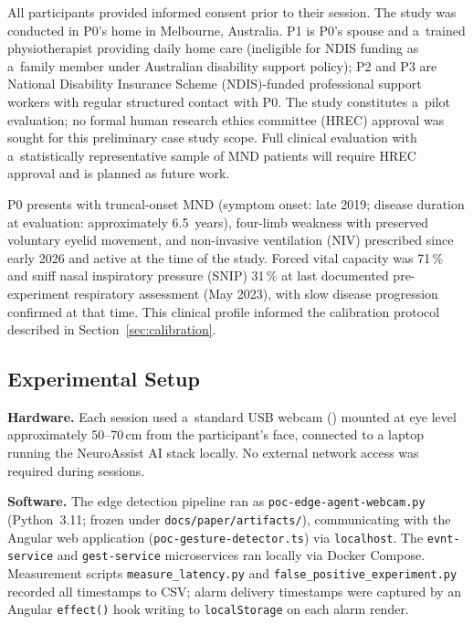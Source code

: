 All participants provided informed consent prior to their session. The study was
conducted in P0's home in Melbourne, Australia. P1 is P0's spouse and a~trained
physiotherapist providing daily home care (ineligible for NDIS funding as a~family
member under Australian disability support policy); P2 and P3 are National Disability
Insurance Scheme (NDIS)-funded professional support workers with regular structured
contact with P0. The study constitutes a~pilot
evaluation; no formal human research ethics committee (HREC) approval was sought for
this preliminary case study scope. Full clinical evaluation with a~statistically representative sample of MND
patients will require HREC approval and is planned as future work.

P0 presents with truncal-onset MND (symptom onset: late 2019; disease duration at evaluation: approximately 6.5~years), four-limb weakness with preserved voluntary eyelid movement, and non-invasive ventilation (NIV) prescribed since early 2026 and active at the time of the study. Forced vital capacity was 71\,\% and sniff nasal inspiratory pressure (SNIP) 31\,\% at last documented pre-experiment respiratory assessment (May 2023), with slow disease progression confirmed at that time.  This clinical profile informed the calibration protocol described in Section~\ref{sec:calibration}.

\subsection{Experimental Setup}
\label{sec:setup}

\textbf{Hardware.} Each session used a~standard USB webcam
() mounted
at eye level approximately 50--70\,cm from the participant's face, connected to a
laptop running the NeuroAssist AI stack locally. No external network access was
required during sessions.

\textbf{Software.} The edge detection pipeline ran as
\texttt{poc-edge-agent-webcam.py} (Python~3.11; frozen under \texttt{docs/paper/artifacts/}), communicating with the Angular
web application (\texttt{poc-gesture-detector.ts}) via \texttt{localhost}. The
\texttt{evnt-service} and \texttt{gest-service} microservices ran locally via Docker
Compose. Measurement scripts \texttt{measure\_latency.py} and
\texttt{false\_positive\_experiment.py} recorded all timestamps to CSV; alarm
delivery timestamps were captured by an Angular \texttt{effect()} hook writing to
\texttt{localStorage} on each alarm render.

